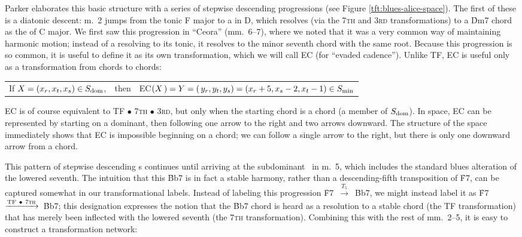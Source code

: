 Parker elaborates this basic structure with a series of stepwise descending
\tf progressions (see Figure \ref{tft:blues-alice-space}). The first of
these is a diatonic descent: m.~2 jumps from the tonic F  major to a \tf in D,
which resolves (via the \textsc{7th} and \textsc{3rd} transformations) to a
\h{Dm7} chord as the \ii of C major. We first saw this progression in
``Ceora'' (mm.~6--7), where we noted that it was a very common way of
maintaining harmonic motion; instead of a \tf resolving to its tonic, it resolves
to the minor seventh chord with the same root. Because this progression is so
common, it is useful to define it as its own transformation, which we will
call EC (for ``evaded cadence''). Unlike TF, EC is useful only as a
transformation from \V chords to \ii chords: \\
%
\vspace{0.5\baselineskip}
\addtolength{\tabcolsep}{-3pt}
\begin{tabular}{lcl}
  If $X = (x_r, x_t, x_s) \in S_{\mathrm{dom}}$, & then &
    EC$(X\,) = Y = (\,y_r, y_t, y_s) = (x_r+5, x_s-2, x_t-1) \in S_{\mathrm{min}}$
\end{tabular}
\addtolength{\tabcolsep}{3pt}
\vspace{0.5\baselineskip}

\noindent EC is of course equivalent to TF $\bullet$ \textsc{7th} $\bullet$
\textsc{3rd}, but only when the starting chord is a \V chord (a member of
$S_{\mathrm{dom}}$). In \tf space, EC can be represented by starting on a dominant, then
following one arrow to the right and two arrows downward. The structure of the
space immediately shows that EC is impossible beginning on a \ii chord; we can
follow a single arrow to the right, but there is only one downward arrow from
a \V chord.

This pattern of stepwise descending \tf{}s continues until arriving at the
subdominant \Bflat\ in m.~5, which includes the standard blues alteration of
the lowered seventh. The intuition that this \h{Bb7} is in fact a
stable harmony, rather than a descending-fifth transposition of \h{F7}, can be
captured somewhat in our transformational labels. Instead of labeling this progression
\mbox{\h{F7} $\xrightarrow{T_5}$ \h{Bb7}}, we might instead label it as
\mbox{\h{F7} $\xrightarrow{\mathrm{TF}\ \bullet\ \text{\textsc{7th}}}$ \h{Bb7}};
this designation expresses the notion that the \h{Bb7} chord is heard as a
resolution to a stable chord (the TF transformation) that has merely been
inflected with the lowered seventh (the \textsc{7th} transformation).
Combining this with the rest of mm.~2--5, it is easy to construct a
transformation network:

